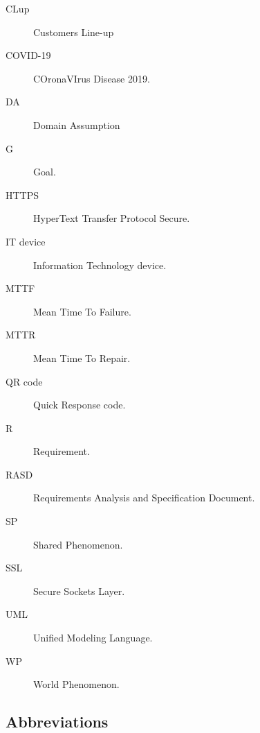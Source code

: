 \documentclass[../../main.tex]{subfiles}
\begin{document}
\begin{description}
    
    \item[CLup] Customers Line-up
    
    \item[COVID-19] COronaVIrus Disease 2019.
    
    \item[DA] Domain Assumption
    
    \item[G] Goal.

    \item[HTTPS] HyperText Transfer Protocol Secure.
    
    \item[IT device] Information Technology device.

    \item[MTTF] Mean Time To Failure.

    \item[MTTR] Mean Time To Repair.
    
    \item[QR code] Quick Response code.

    \item[R] Requirement. 
    
    \item[RASD] Requirements Analysis and Specification Document.
    
    \item[SP] Shared Phenomenon.

    \item[SSL] Secure Sockets Layer.
    
    \item[UML] Unified Modeling Language.
    
    \item[WP] World Phenomenon.
\end{description}

\subsection{Abbreviations}
\end{document}
